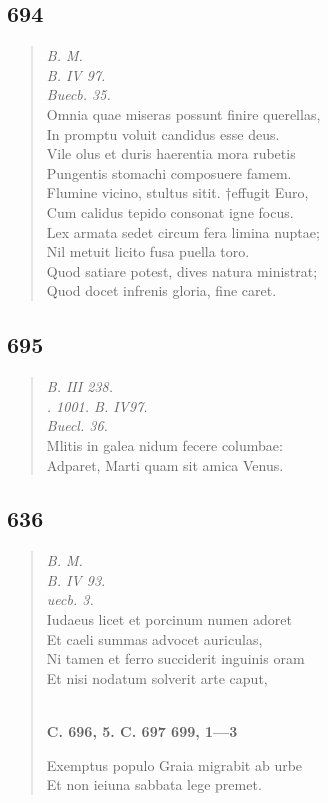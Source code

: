 \documentclass[11pt, a4paper]{report}
\begin{document}
            \subsection*{694}
      \begin{verse}
      \textit{B. M.} \\ \textit{B. IV 97.} \\ \textit{Buecb. 35.} \\ Omnia quae miseras possunt finire querellas, \\ In promptu voluit candidus esse deus. \\ Vile olus et duris haerentia mora rubetis \\ Pungentis stomachi composuere famem. \\ Flumine vicino, stultus sitit. †effugit Euro, \\ Cum calidus tepido consonat igne focus. \\ Lex armata sedet circum fera limina nuptae; \\ Nil metuit licito fusa puella toro. \\ Quod satiare potest, dives natura ministrat; \\ Quod docet infrenis gloria, fine caret. \\ 
      \end{verse}
  
            \subsection*{695}
      \begin{verse}
      \textit{B. III 238.} \\ \textit{. 1001. B. IV97.} \\ \textit{Buecl. 36.} \\ Mlitis in galea nidum fecere columbae: \\ Adparet, Marti quam sit amica Venus. \\ 
      \end{verse}
  
            \subsection*{636}
      \begin{verse}
      \textit{B. M.} \\ \textit{B. IV 93.} \\ \textit{uecb. 3.} \\ Iudaeus licet et porcinum numen adoret \\ Et caeli summas advocet auriculas, \\ Ni tamen et ferro succiderit inguinis oram \\ Et nisi nodatum solverit arte caput, \\ 
        ﻿\pagebreak 
     \marginpar{[170]} \begin{center} \textbf{C. 696, 5. C. 697 699, 1—3} \end{center}Exemptus populo Graia migrabit ab urbe \\ Et non ieiuna sabbata lege premet. \\ 
      \end{verse}
  
\end{document}
